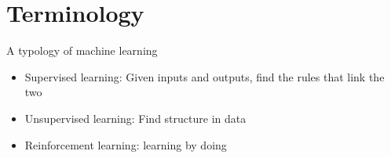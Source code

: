 \documentclass[color=usenames,dvipsnames]{beamer}
\begin{document}
\section{Terminology}


\begin{frame}{A typology of machine learning} 


\begin{itemize}

\item Supervised learning: Given inputs and outputs, find the rules that link the two
\item Unsupervised learning: Find structure in data
\item Reinforcement learning: learning by doing

\end{itemize}

\end{frame}
\end{document}
